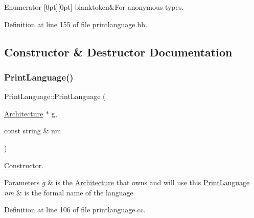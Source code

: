 \begin{DoxyEnumFields}{Enumerator}
[0pt][0pt]{}\mbox{\label{class_print_language_a7102f70f47777d8b17af52c5157c473ea7bd17915e6ff44d2184e03d1b38cd7a8}} 
blanktoken&For anonymous types. \\
\hline

\end{DoxyEnumFields}


Definition at line 155 of file printlanguage.\+hh.



\subsection{Constructor \& Destructor Documentation}
\mbox{\label{class_print_language_a43e6e04dbeaba98bf571dc089831a2fc}} 
\subsubsection{\texorpdfstring{PrintLanguage()}{PrintLanguage()}}
{\footnotesize\ttfamily Print\+Language\+::\+Print\+Language (\begin{DoxyParamCaption}\item[{\mbox{\hyperlink{class_architecture}{Architecture}} $\ast$}]{g,  }\item[{const string \&}]{nm }\end{DoxyParamCaption})}



\mbox{\hyperlink{class_constructor}{Constructor}}. 


\begin{DoxyParams}{Parameters}
{\em g} & is the \mbox{\hyperlink{class_architecture}{Architecture}} that owns and will use this \mbox{\hyperlink{class_print_language}{Print\+Language}} \\
\hline
{\em nm} & is the formal name of the language \\
\hline
\end{DoxyParams}


Definition at line 106 of file printlanguage.\+cc.

\mbox{\label{class_print_language_a38c51536214ec4125e43d2eeb0d454cf}} 
